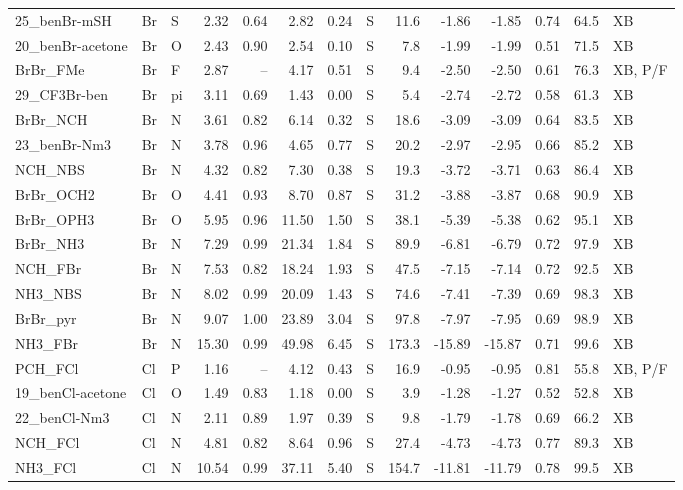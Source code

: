 \documentclass[journal=jcisd8,manuscript=suppinfo]{achemso}
\begin{document}
\begin{singlespace}
{\begin{longtable}{lllrrrrlrrrrrl}
25\_benBr-mSH & Br & S & 2.32 & 0.64 & 2.82 & 0.24 & S & 11.6 & -1.86 & -1.85 & 0.74 & 64.5 & XB\\
20\_benBr-acetone & Br & O & 2.43 & 0.90 & 2.54 & 0.10 & S & 7.8 & -1.99 & -1.99 & 0.51 & 71.5 & XB\\
BrBr\_FMe & Br & F & 2.87 & -- & 4.17 & 0.51 & S & 9.4 & -2.50 & -2.50 & 0.61 & 76.3 & XB, P/F\\
29\_CF3Br-ben & Br & pi & 3.11 & 0.69 & 1.43 & 0.00 & S & 5.4 & -2.74 & -2.72 & 0.58 & 61.3 & XB\\
BrBr\_NCH & Br & N & 3.61 & 0.82 & 6.14 & 0.32 & S & 18.6 & -3.09 & -3.09 & 0.64 & 83.5 & XB\\
23\_benBr-Nm3 & Br & N & 3.78 & 0.96 & 4.65 & 0.77 & S & 20.2 & -2.97 & -2.95 & 0.66 & 85.2 & XB\\
NCH\_NBS & Br & N & 4.32 & 0.82 & 7.30 & 0.38 & S & 19.3 & -3.72 & -3.71 & 0.63 & 86.4 & XB\\
BrBr\_OCH2 & Br & O & 4.41 & 0.93 & 8.70 & 0.87 & S & 31.2 & -3.88 & -3.87 & 0.68 & 90.9 & XB\\
BrBr\_OPH3 & Br & O & 5.95 & 0.96 & 11.50 & 1.50 & S & 38.1 & -5.39 & -5.38 & 0.62 & 95.1 & XB\\
BrBr\_NH3 & Br & N & 7.29 & 0.99 & 21.34 & 1.84 & S & 89.9 & -6.81 & -6.79 & 0.72 & 97.9 & XB\\
NCH\_FBr & Br & N & 7.53 & 0.82 & 18.24 & 1.93 & S & 47.5 & -7.15 & -7.14 & 0.72 & 92.5 & XB\\
NH3\_NBS & Br & N & 8.02 & 0.99 & 20.09 & 1.43 & S & 74.6 & -7.41 & -7.39 & 0.69 & 98.3 & XB\\
BrBr\_pyr & Br & N & 9.07 & 1.00 & 23.89 & 3.04 & S & 97.8 & -7.97 & -7.95 & 0.69 & 98.9 & XB\\
NH3\_FBr & Br & N & 15.30 & 0.99 & 49.98 & 6.45 & S & 173.3 & -15.89 & -15.87 & 0.71 & 99.6 & XB\\
PCH\_FCl & Cl & P & 1.16 & -- & 4.12 & 0.43 & S & 16.9 & -0.95 & -0.95 & 0.81 & 55.8 & XB, P/F\\
19\_benCl-acetone & Cl & O & 1.49 & 0.83 & 1.18 & 0.00 & S & 3.9 & -1.28 & -1.27 & 0.52 & 52.8 & XB\\
22\_benCl-Nm3 & Cl & N & 2.11 & 0.89 & 1.97 & 0.39 & S & 9.8 & -1.79 & -1.78 & 0.69 & 66.2 & XB\\
NCH\_FCl & Cl & N & 4.81 & 0.82 & 8.64 & 0.96 & S & 27.4 & -4.73 & -4.73 & 0.77 & 89.3 & XB\\
NH3\_FCl & Cl & N & 10.54 & 0.99 & 37.11 & 5.40 & S & 154.7 & -11.81 & -11.79 & 0.78 & 99.5 & XB\\

\end{longtable}}
\end{singlespace}
\end{document}
